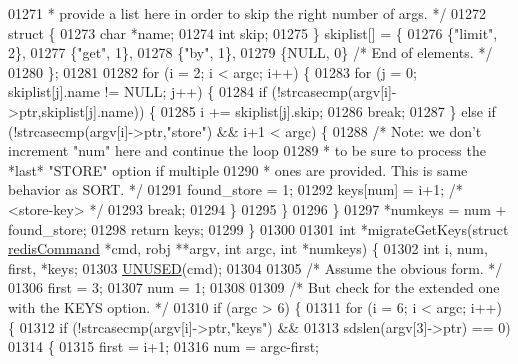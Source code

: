 \begin{DoxyCode}
01271 \textcolor{comment}{     * provide a list here in order to skip the right number of args. */}
01272     \textcolor{keyword}{struct} \{
01273         \textcolor{keywordtype}{char} *name;
01274         \textcolor{keywordtype}{int} skip;
01275     \} skiplist[] = \{
01276         \{\textcolor{stringliteral}{"limit"}, 2\},
01277         \{\textcolor{stringliteral}{"get"}, 1\},
01278         \{\textcolor{stringliteral}{"by"}, 1\},
01279         \{NULL, 0\} \textcolor{comment}{/* End of elements. */}
01280     \};
01281 
01282     \textcolor{keywordflow}{for} (i = 2; i < argc; i++) \{
01283         \textcolor{keywordflow}{for} (j = 0; skiplist[j].name != NULL; j++) \{
01284             \textcolor{keywordflow}{if} (!strcasecmp(argv[i]->ptr,skiplist[j].name)) \{
01285                 i += skiplist[j].skip;
01286                 \textcolor{keywordflow}{break};
01287             \} \textcolor{keywordflow}{else} \textcolor{keywordflow}{if} (!strcasecmp(argv[i]->ptr,\textcolor{stringliteral}{"store"}) && i+1 < argc) \{
01288                 \textcolor{comment}{/* Note: we don't increment "num" here and continue the loop}
01289 \textcolor{comment}{                 * to be sure to process the *last* "STORE" option if multiple}
01290 \textcolor{comment}{                 * ones are provided. This is same behavior as SORT. */}
01291                 found\_store = 1;
01292                 keys[num] = i+1; \textcolor{comment}{/* <store-key> */}
01293                 \textcolor{keywordflow}{break};
01294             \}
01295         \}
01296     \}
01297     *numkeys = num + found\_store;
01298     \textcolor{keywordflow}{return} keys;
01299 \}
01300 
01301 \textcolor{keywordtype}{int} *migrateGetKeys(\textcolor{keyword}{struct} \hyperlink{structredisCommand}{redisCommand} *cmd, robj **argv, \textcolor{keywordtype}{int} argc, \textcolor{keywordtype}{int} *numkeys) \{
01302     \textcolor{keywordtype}{int} i, num, first, *keys;
01303     \hyperlink{server_8h_ae7c9dc8f13568a9c856573751f1ee1ec}{UNUSED}(cmd);
01304 
01305     \textcolor{comment}{/* Assume the obvious form. */}
01306     first = 3;
01307     num = 1;
01308 
01309     \textcolor{comment}{/* But check for the extended one with the KEYS option. */}
01310     \textcolor{keywordflow}{if} (argc > 6) \{
01311         \textcolor{keywordflow}{for} (i = 6; i < argc; i++) \{
01312             \textcolor{keywordflow}{if} (!strcasecmp(argv[i]->ptr,\textcolor{stringliteral}{"keys"}) &&
01313                 sdslen(argv[3]->ptr) == 0)
01314             \{
01315                 first = i+1;
01316                 num = argc-first;

\end{DoxyCode}
